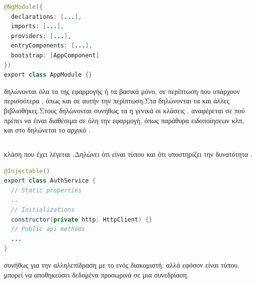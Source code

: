 	\begin{lstlisting}[language=Java]
@NgModule({
  declarations: [...],
  imports: [...],
  providers: [...],
  entryComponents: [...],
  bootstrap: [AppComponent]
})
export class AppModule {}
	\end{lstlisting}


  δηλώνονται όλα τα  της εφαρμογής ή τα βασικά μόνο, σε περίπτωση που υπάρχουν περισσότερα , όπως και σε αυτήν την περίπτωση.Στα  δηλώνονται τα  και άλλες βιβλιοθήκες.Στους  δηλώνονται συνήθως τα  η γενικά οι κλάσεις . αναφέρεται σε  πού πρέπει να έιναι διαθέσιμα σε όλη την εφαρμογή, όπως παράθυρα ειδοποίησεων κλπ, και στο  δηλώνεται το αρχικό .

\subsection*{}
 κλάση που έχει  λέγεται .Δηλώνει ότι είναι τύπου  και ότι υποστηρίζει την δυνατότητα .\\

	\begin{lstlisting}[language=Java]
@Injectable()
export class AuthService {
  // Static properties
  ..
  // Initializations
  constructor(private http: HttpClient) {}
  // Public api methods
  ...
}
	\end{lstlisting}

 συνήθως για την αλληλεπίδραση με το  ενός διακομιστή, αλλά εφόσον είναι  τύπου, μπορεί να αποθηκεύσει δεδομένα προσωρινά σε μια συνεδρίαση.
